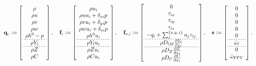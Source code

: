 \begin{equation}\label{eq:gemsGovVecs}
    \consVec \defEq \left[
    \begin{array}{c}
    \density \\
	\density \velX \\
	\density \velY \\
	\density \velZ \\
	\density \stagEnth - \pressure \\ \hdashline[2pt/2pt]
	\density \mfSpec \\ \hdashline[2pt/2pt]
	\density \mixFrac \\
	\density \progVar
    \end{array}
    \right] , \quad
    \invFluxDir \defEq \left[
    \begin{array}{c}
    \density \vel_{\spatialIdx} \\
	\density \velX \vel_{\spatialIdx} + \delta_{x \spatialIdx} \pressure \\
	\density \velY \vel_{\spatialIdx} + \delta_{y \spatialIdx} \pressure \\
	\density \velZ \vel_{\spatialIdx} + \delta_{z \spatialIdx} \pressure \\
	\density \stagEnth \vel_{\spatialIdx} \\ \hdashline[2pt/2pt]
	\density \mfSpec \vel_{\spatialIdx} \\ \hdashline[2pt/2pt]
	\density \mixFrac \vel_{\spatialIdx} \\
	\density \progVar \vel_{\spatialIdx}
    \end{array}
    \right] , \quad
	\viscFluxDir \defEq \left[
    \begin{array}{c}
    0 \\
	\shearStress_{\spatialIdx x} \\
	\shearStress_{\spatialIdx y} \\
	\shearStress_{\spatialIdx z} \\
	- \heatFlux_{\spatialIdx} + \sum_{\spatialIdxTwo}^{\{x,y,z\}} \vel_{\spatialIdxTwo} \shearStress_{\spatialIdx \spatialIdxTwo}\\ \hdashline[2pt/2pt]
	\density \massDiffSpec \pde{\mfSpec}{x_{\spatialIdx}} \\ \hdashline[2pt/2pt]
	\density \massDiffVar_{\mixFrac} \pde{\mixFrac}{x_{\spatialIdx}} \\
	\density \massDiffVar_{\progVar} \pde{\progVar}{x_{\spatialIdx}}
    \end{array}
    \right], \quad
	\sourceVec \defEq \left[
    \begin{array}{c}
    0 \\
	0 \\
	0 \\
	0 \\
	0 \\ \hdashline[2pt/2pt]
	\prodRateSpecFR \\ \hdashline[2pt/2pt]
	0 \\
	\prodRateFPV
    \end{array} \right].
\end{equation}
